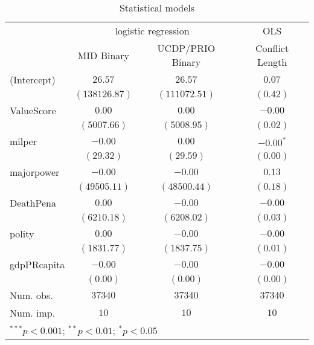 
\begin{table}
\begin{center}
\begin{tabular}{l c c c}
\hline
 & \multicolumn{2}{c}{logistic regression} & \multicolumn{1}{c}{OLS} \\
\cline{2-3} \cline{4-4}
 & MID Binary & UCDP/PRIO Binary & Conflict Length \\
\hline
(Intercept) & $26.57$       & $26.57$       & $0.07$      \\
            & $(138126.87)$ & $(111072.51)$ & $(0.42)$    \\
ValueScore  & $0.00$        & $0.00$        & $-0.00$     \\
            & $(5007.66)$   & $(5008.95)$   & $(0.02)$    \\
milper      & $-0.00$       & $0.00$        & $-0.00^{*}$ \\
            & $(29.32)$     & $(29.59)$     & $(0.00)$    \\
majorpower  & $-0.00$       & $-0.00$       & $0.13$      \\
            & $(49505.11)$  & $(48500.44)$  & $(0.18)$    \\
DeathPena   & $0.00$        & $-0.00$       & $-0.00$     \\
            & $(6210.18)$   & $(6208.02)$   & $(0.03)$    \\
polity      & $0.00$        & $-0.00$       & $-0.00$     \\
            & $(1831.77)$   & $(1837.75)$   & $(0.01)$    \\
gdpPRcapita & $-0.00$       & $-0.00$       & $-0.00$     \\
            & $(0.00)$      & $(0.00)$      & $(0.00)$    \\
\hline
Num. obs.   & $37340$       & $37340$       & $37340$     \\
Num. imp.   & $10$          & $10$          & $10$        \\
\hline
\multicolumn{4}{l}{\scriptsize{$^{***}p<0.001$; $^{**}p<0.01$; $^{*}p<0.05$}}
\end{tabular}
\caption{Statistical models}
\label{table:coefficients}
\end{center}
\end{table}
